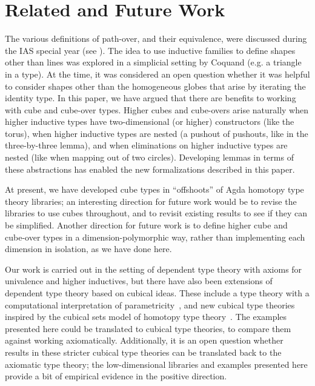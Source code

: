 \section{Related and Future Work}

The various definitions of path-over, and their equivalence, were
discussed during the IAS special year (see \citep[Remark
  6.3.2]{uf13hott-book}).  The idea to use inductive families to define
shapes other than lines was explored in a simplicial setting by Coquand
(e.g. a triangle in a type).  At the time, it was considered an open
question whether it was helpful to consider shapes other than the
homogeneous globes that arise by iterating the identity type.  In this
paper, we have argued that there are benefits to working with cube and
cube-over types.  Higher cubes and cube-overs arise naturally when
higher inductive types have two-dimensional (or higher) constructors
(like the torus), when higher inductive types are nested (a pushout of
pushouts, like in the three-by-three lemma), and when eliminations on
higher inductive types are nested (like when mapping out of two
circles).  Developing lemmas in terms of these abstractions has enabled
the new formalizations described in this paper.

At present, we have developed cube types in ``offshoots'' of Agda
homotopy type theory libraries; an interesting direction for future work
would be to revise the libraries to use cubes throughout, and to revisit
existing results to see if they can be simplified.  Another direction
for future work is to define higher cube and cube-over types in a
dimension-polymorphic way, rather than implementing each dimension in
isolation, as we have done here.

Our work is carried out in the setting of dependent type theory with
axioms for univalence and higher inductives, but there have also been
extensions of dependent type theory based on cubical ideas.  These
include a type theory with a computational interpretation of
parametricity~\citep{bernardy12parametricity}, and new cubical type
theories~\citep{coquand14variations,altenkirchkaposi14cubical,lb14cubes-oxford,polonsky14internalization}
inspired by the cubical sets model of homotopy type
theory~\citep{coquand+13cubical}.  The examples presented here could be
translated to cubical type theories, to compare them against working
axiomatically.  Additionally, it is an open question whether results in
these stricter cubical type theories can be translated back to the
axiomatic type theory; the low-dimensional libraries and examples
presented here provide a bit of empirical evidence in the positive
direction.
